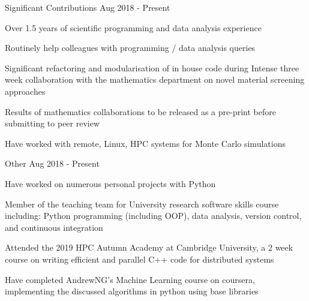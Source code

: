 
\begin{cventries}

  \cventry
    { } %
    {Significant Contributions} %
    { } %
    {Aug 2018 - Present} %
    {
      \begin{cvitems} %
        \item Over 1.5 years of scientific programming and data analysis experience
        \item Routinely help colleagues with programming / data analysis queries
        \item Significant refactoring and modularisation of in house code during Intense three week collaboration with the mathematics department on novel material screening approaches
        \item Results of mathematics collaborations to be released as a pre-print before submitting to peer review
        \item Have worked with remote, Linux, HPC systems for Monte Carlo simulations
      \end{cvitems}
    }

  \cventry
    { } %
    {Other} %
    { } %
    {Aug 2018 - Present} %
    {
      \begin{cvitems} %
      \item Have worked on numerous personal projects with Python
      \item Member of the teaching team for University research software skills course including: Python programming (including OOP), data analysis, version control, and continuous integration
      \item Attended the 2019 HPC Autumn Academy at Cambridge University, a 2 week course on writing efficient and parallel C++ code for distributed systems
      \item Have completed AndrewNG's Machine Learning course on coursera, implementing the discussed algorithms in python using base libraries
      \end{cvitems}
    }

\end{cventries}
